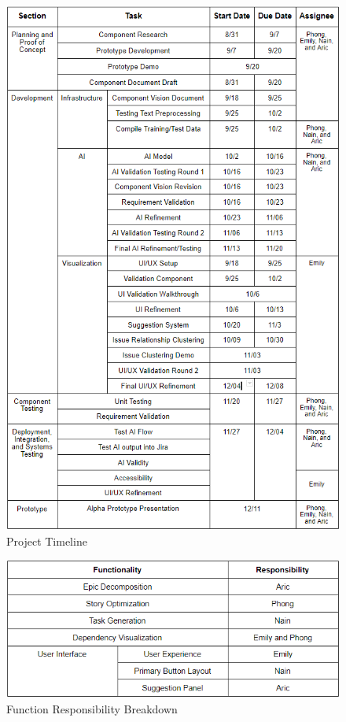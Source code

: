 \begin{figure}
\centering
\includegraphics[width=\textwidth,keepaspectratio]{./figure/ProjectTimeline.png}
\caption{Project Timeline}
\label{fig:timeline}
\end{figure}

\begin{figure}
\centering
\includegraphics[width=\textwidth,keepaspectratio]{./figure/FunctionResponsibility.png}
\caption{Function Responsibility Breakdown}
\label{fig:responsibility}
\end{figure}